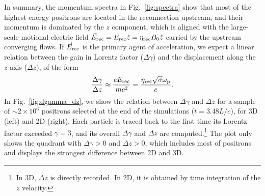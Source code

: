 \documentclass[twocolumn,twocolappendix]{aastex63}
\newcommand{\figg}[1]{Fig.~\ref{fig:#1}}
\newcommand{\ls}{\textcolor{teal}}
\newcommand{\hz}{\textcolor{orange}}
\begin{document}
\begin{figure*}
    \centering
    \qquad
    \caption{2D histograms of the gain in positron Lorentz factor ($\Delta \gamma$) and displacement along the $z$-axis ($\Delta z$), in 3D (left plot) and 2D (right plot). The positrons are selected at the end of the simulations ($ct/L=3.48$) and traced back to the first time they are saved. For the 2D case, the particle displacement along the $z$-axis is calculated by time integration of the $z$ velocity. 
    The relation expected from  Eq.~\ref{eq:e_est} is marked with a dashed white line in the left panel. The red and yellow lines in the left panel represent the tracks in the $\Delta \gamma-\Delta z$ plane of the two high-energy positrons shown in Fig.~\ref{fig:prtl_traj}; in this case, the differences $\Delta \gamma$ and $\Delta z$ are computed at each time with respect to the initial time when the particle Lorentz factor first exceeded $\gamma=3$.
    }
    \label{fig:dgamma_dz}
\end{figure*}

In summary, the momentum spectra in \figg{spectra} show that
most of the highest energy positrons are located in the reconnection upstream, and their momentum is dominated by the $z$ component, which is aligned with the large-scale motional electric field $\vec{E}_{\rm rec}=E_{\rm rec}\hat{z}=\eta_{\rm rec}B_0 \hat{z}$ carried by the upstream converging flows. If $\vec{E}_{\rm rec}$ is the primary agent of acceleration, we expect a linear relation between the gain in Lorentz factor ($\Delta \gamma$) and the displacement along the $z$-axis ($\Delta z$), of the form
\begin{equation}\label{eq:e_est}
    \frac{\Delta\gamma}{\Delta z} \approx \frac{e E_{\rm rec}}{mc^2} = \frac{\eta_{\rm rec}\sqrt{\sigma}\omega_{\rm p}}{c}.%
\end{equation}
In Fig.~\ref{fig:dgamma_dz}, we show the relation between $\Delta \gamma$ and $\Delta z$ for a sample of $\sim 2\times 10^6$ positrons selected at the end of the simulations ($t = 3.48L/c$), for 3D (left) and 2D (right). Each particle is traced back to the first time its Lorentz factor exceeded $\gamma=3$, and its overall $\Delta \gamma$ and $\Delta z$ are computed.\footnote{In 3D, $\Delta z$ is directly recorded. In 2D, it is obtained by time integration of the $z$ velocity.} The plot only shows the quadrant with $\Delta \gamma>0$ and $\Delta z>0$, which includes most of positrons and displays the strongest difference between 2D and 3D.
\end{document}
